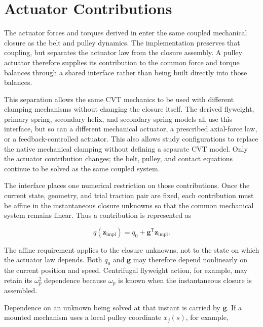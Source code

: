 \documentclass[11pt]{report}
\numberwithin{equation}{section}
\newcommand{\vect}[1]{\bm{#1}}
\begin{document}
\section{Actuator Contributions}
\label{app:num_affine_assembly}

The actuator forces and torques derived in
 enter the
same coupled mechanical closure as the belt and pulley dynamics.  The
implementation preserves that coupling, but separates the actuator law from
the closure assembly.  A pulley actuator therefore supplies its contribution
to the common force and torque balances through a shared interface rather than
being built directly into those balances.

This separation allows the same CVT mechanics to be used with different
clamping mechanisms without changing the closure itself.  The derived flyweight, primary spring, secondary helix, and secondary spring
models all use this interface, but so can a different mechanical actuator, a
prescribed axial-force law, or a feedback-controlled actuator.  This also
allows study configurations to replace the native mechanical clamping without
defining a separate CVT model.  Only the actuator contribution changes; the
belt, pulley, and contact equations continue to be solved as the same coupled
system.

The interface places one numerical restriction on those contributions.  Once
the current state, geometry, and trial traction pair are fixed, each
contribution must be affine in the instantaneous closure unknowns so that the
common mechanical system remains linear.  Thus a contribution is represented
as

\begin{equation}
    q(\vect{z}_{\mathrm{impl}})
    =q_0+\vect{g}^{\mathsf T}\vect{z}_{\mathrm{impl}}.
    \label{eq:appendix_affine_contribution}
\end{equation}

The affine requirement applies to the closure unknowns, not to the state on
which the actuator law depends.  Both $q_0$ and $\vect{g}$ may therefore depend
nonlinearly on the current position and speed.  Centrifugal flyweight action,
for example, may retain its $\omega_p^2$ dependence because $\omega_p$ is known
when the instantaneous closure is assembled.

Dependence on an unknown being solved at that instant is carried by
$\vect{g}$.  If a mounted mechanism uses a local pulley coordinate $x_j(s)$,
for example,
\end{document}
